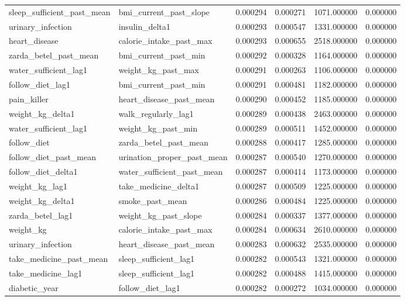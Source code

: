\begin{longtable}{llrrrr}
sleep\_sufficient\_past\_mean & bmi\_current\_past\_slope & 0.000294 & 0.000271 & 1071.000000 & 0.000000 \\
urinary\_infection & insulin\_delta1 & 0.000293 & 0.000547 & 1331.000000 & 0.000000 \\
heart\_disease & calorie\_intake\_past\_max & 0.000293 & 0.000655 & 2518.000000 & 0.000000 \\
zarda\_betel\_past\_mean & bmi\_current\_past\_min & 0.000292 & 0.000328 & 1164.000000 & 0.000000 \\
water\_sufficient\_lag1 & weight\_kg\_past\_max & 0.000291 & 0.000263 & 1106.000000 & 0.000000 \\
follow\_diet\_lag1 & bmi\_current\_past\_min & 0.000291 & 0.000481 & 1182.000000 & 0.000000 \\
pain\_killer & heart\_disease\_past\_mean & 0.000290 & 0.000452 & 1185.000000 & 0.000000 \\
weight\_kg\_delta1 & walk\_regularly\_lag1 & 0.000289 & 0.000438 & 2463.000000 & 0.000000 \\
water\_sufficient\_lag1 & weight\_kg\_past\_min & 0.000289 & 0.000511 & 1452.000000 & 0.000000 \\
follow\_diet & zarda\_betel\_past\_mean & 0.000288 & 0.000417 & 1285.000000 & 0.000000 \\
follow\_diet\_past\_mean & urination\_proper\_past\_mean & 0.000287 & 0.000540 & 1270.000000 & 0.000000 \\
follow\_diet\_delta1 & water\_sufficient\_past\_mean & 0.000287 & 0.000414 & 1173.000000 & 0.000000 \\
weight\_kg\_lag1 & take\_medicine\_delta1 & 0.000287 & 0.000509 & 1225.000000 & 0.000000 \\
weight\_kg\_delta1 & smoke\_past\_mean & 0.000286 & 0.000484 & 1225.000000 & 0.000000 \\
zarda\_betel\_lag1 & weight\_kg\_past\_slope & 0.000284 & 0.000337 & 1377.000000 & 0.000000 \\
weight\_kg & calorie\_intake\_past\_max & 0.000284 & 0.000634 & 2610.000000 & 0.000000 \\
urinary\_infection & heart\_disease\_past\_mean & 0.000283 & 0.000632 & 2535.000000 & 0.000000 \\
take\_medicine\_past\_mean & sleep\_sufficient\_lag1 & 0.000282 & 0.000543 & 1321.000000 & 0.000000 \\
take\_medicine\_lag1 & sleep\_sufficient\_lag1 & 0.000282 & 0.000488 & 1415.000000 & 0.000000 \\
diabetic\_year & follow\_diet\_lag1 & 0.000282 & 0.000272 & 1034.000000 & 0.000000 \\

\end{longtable}
